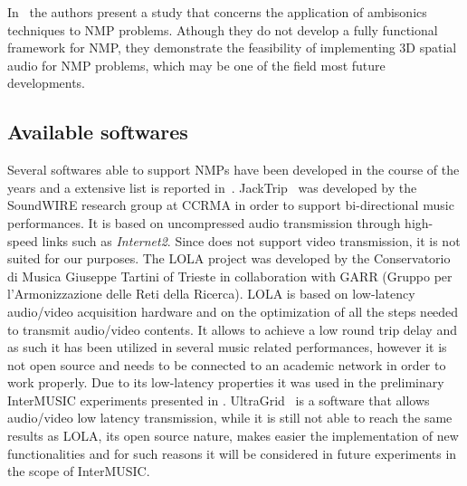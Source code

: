 In~\cite{gurevich2011ambisonic} the authors present a study that concerns the application of ambisonics techniques to NMP problems. Athough they do not develop a fully functional framework for NMP, they demonstrate the feasibility of implementing 3D spatial audio for NMP problems, which may be one of the field most future developments.


\subsection{Available softwares}
Several softwares able to support NMPs have been developed in the course of the years and a extensive list is reported in~\cite{RottondiOverview}.
JackTrip~\cite{CaceresJacktrip} was developed by the SoundWIRE research group at CCRMA in order to support bi-directional music performances. It is based on uncompressed audio transmission through high-speed links such as \textit{Internet2}. Since does not support video transmission, it is not suited for our purposes.
The LOLA\cite{drioli2013networked} project was developed by the Conservatorio di Musica Giuseppe Tartini of Trieste in collaboration with GARR (Gruppo per l'Armonizzazione delle Reti della Ricerca). LOLA is based on low-latency audio/video acquisition hardware and on the optimization of all the steps needed to transmit audio/video contents. It allows to achieve a low round trip delay and as such it has been utilized in several music related performances, however it is not open source and needs to be connected to an academic network in order to work properly. Due to its low-latency properties it was used in the preliminary InterMUSIC experiments presented in \cite{CIM2018}. 
UltraGrid~\cite{holub2006high} is a software that allows audio/video low latency transmission, while it is still not able to reach the same results as LOLA, its open source nature, makes easier the implementation of new functionalities and for such reasons it will be considered in future experiments in the scope of InterMUSIC.